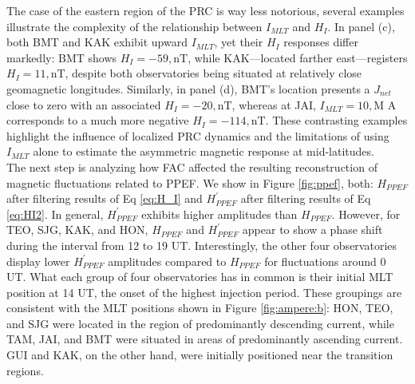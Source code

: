 \documentclass[a4paper]{article}
\theoremstyle{plain}
\theoremstyle{definition}
\begin{document}
	The case of the eastern region of the PRC is way less notorious, several examples illustrate the complexity of the relationship between $I_{MLT}$ and $H_I$. In panel (c), both BMT and KAK exhibit upward $I_{MLT}$, yet their $H_I$ responses differ markedly: BMT shows $H_I = -59 , \text{nT}$, while KAK—located farther east—registers $H_I = 11 , \text{nT}$, despite both observatories being situated at relatively close geomagnetic longitudes. Similarly, in panel (d), BMT's location presents a $J_{net}$ close to zero with an associated $H_I = -20 , \text{nT}$, whereas at JAI, $I_{MLT} = 10 , \text{M A}$ corresponds to a much more negative $H_I = -114 , \text{nT}$. These contrasting examples highlight the influence of localized PRC dynamics and the limitations of using $I_{MLT}$ alone to estimate the asymmetric magnetic response at mid-latitudes.\\
	
	
	The next step is analyzing how FAC affected the resulting reconstruction of magnetic fluctuations related to PPEF. We show in Figure \ref{fig:ppef}, both: $H_{PPEF}$ after filtering results of Eq \ref{eq:H_I} and $H_{PPEF}^\prime$ after filtering results of Eq \ref{eq:HI2}. In general, $H_{PPEF}^\prime$ exhibits higher amplitudes than $H_{PPEF}$. However, for TEO, SJG, KAK, and HON, $H_{PPEF}$ and $H_{PPEF}^\prime$ appear to show a phase shift during the interval from 12 to 19 UT. Interestingly, the other four observatories display lower $H_{PPEF}^\prime$ amplitudes compared to $H_{PPEF}$ for fluctuations around 0 UT. What each group of four observatories has in common is their initial MLT position at 14 UT, the onset of the highest injection period. These groupings are consistent with the MLT positions shown in Figure \ref{fig:ampere:b}: HON, TEO, and SJG were located in the region of predominantly descending current, while TAM, JAI, and BMT were situated in areas of predominantly ascending current. GUI and KAK, on the other hand, were initially positioned near the transition regions.\\
	
\end{document}
